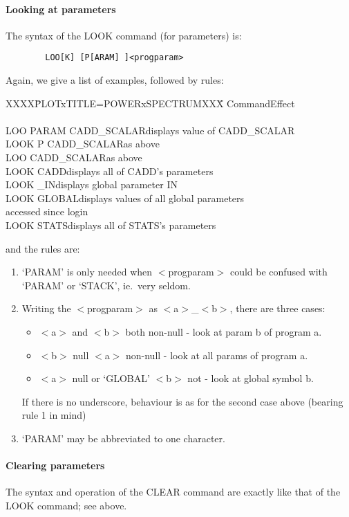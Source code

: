 \paragraph {Looking at parameters}
The syntax of the LOOK command (for parameters) is:
\begin{verbatim}
        LOO[K] [P[ARAM] ]<progparam>
\end{verbatim}
Again, we give a list of examples, followed by rules:
\begin{tabbing}
XXXX\=PLOTxTITLE=POWERxSPECTRUMXXX\=\kill
\>Command\>Effect\\
\\
\>LOO PARAM CADD\_SCALAR\>displays value of CADD\_SCALAR\\
\>LOOK P CADD\_SCALAR\>as above\\
\>LOO CADD\_SCALAR\>as above\\
\>LOOK CADD\>displays all of CADD's parameters\\
\>LOOK \_IN\>displays global parameter IN\\
\>LOOK GLOBAL\>displays values of all global parameters\\
\>\>accessed since login\\
\>LOOK STATS\>displays all of STATS's parameters\\
\end{tabbing}
and the rules are:
\begin{enumerate}
\item `PARAM' is only needed when $<$progparam$>$ could be confused with
`PARAM' or `STACK', ie.\ very seldom.
\item Writing the $<$progparam$>$ as $<$a$>$\_$<$b$>$, there are three cases:
\begin{itemize}
\item $<$a$>$ and $<$b$>$ both non-null - look at param b of program a.
\item $<$b$>$ null $<$a$>$ non-null - look at all params of program a.
\item $<$a$>$ null or `GLOBAL' $<$b$>$ not - look at global symbol b.
\end{itemize}
If there is no underscore, behaviour is as for the second case above (bearing
rule 1 in mind)
\item `PARAM' may be abbreviated to one character.
\end{enumerate}
\paragraph {Clearing parameters}
The syntax and operation of the CLEAR command are exactly like that of the LOOK
command; see above.

